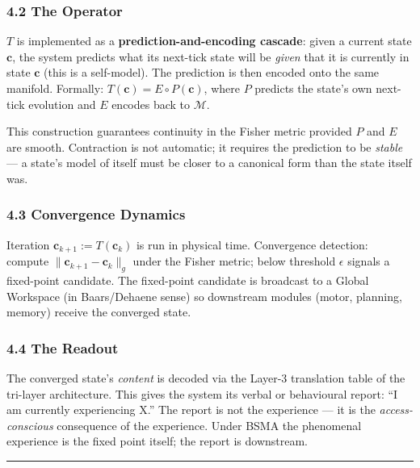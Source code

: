 \documentclass[
  11pt,
  a4paper,
]{article}
\begin{document}
\subsubsection{4.2 The Operator}\label{the-operator}

\(T\) is implemented as a \textbf{prediction-and-encoding cascade}:
given a current state \(\mathbf{c}\), the system predicts what its
next-tick state will be \emph{given} that it is currently in state
\(\mathbf{c}\) (this is a self-model). The prediction is then encoded
onto the same manifold. Formally:
\(T(\mathbf{c}) = E \circ P(\mathbf{c})\), where \(P\) predicts the
state's own next-tick evolution and \(E\) encodes back to
\(\mathcal{M}\).

This construction guarantees continuity in the Fisher metric provided
\(P\) and \(E\) are smooth. Contraction is not automatic; it requires
the prediction to be \emph{stable} --- a state's model of itself must be
closer to a canonical form than the state itself was.

\subsubsection{4.3 Convergence Dynamics}\label{convergence-dynamics}

Iteration \(\mathbf{c}_{k+1} := T(\mathbf{c}_k)\) is run in physical
time. Convergence detection: compute
\(\|\mathbf{c}_{k+1} - \mathbf{c}_k\|_g\) under the Fisher metric; below
threshold \(\epsilon\) signals a fixed-point candidate. The fixed-point
candidate is broadcast to a Global Workspace (in Baars/Dehaene sense) so
downstream modules (motor, planning, memory) receive the converged
state.

\subsubsection{4.4 The Readout}\label{the-readout}

The converged state's \emph{content} is decoded via the Layer-3
translation table of the tri-layer architecture. This gives the system
its verbal or behavioural report: ``I am currently experiencing X.'' The
report is not the experience --- it is the \emph{access-conscious}
consequence of the experience. Under BSMA the phenomenal experience is
the fixed point itself; the report is downstream.

\begin{center}\rule{0.5\linewidth}{0.5pt}\end{center}
\end{document}
